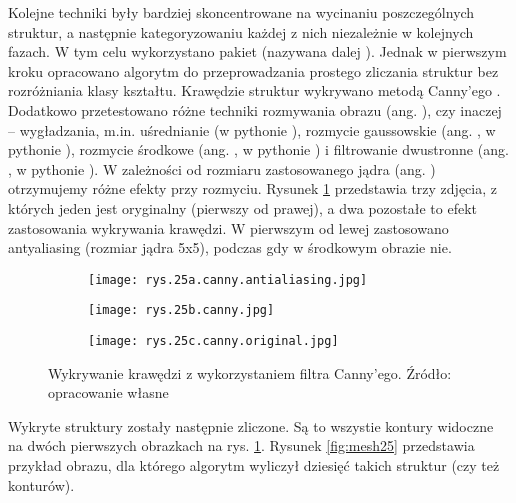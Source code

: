 Kolejne techniki były bardziej skoncentrowane na wycinaniu poszczególnych struktur, a następnie kategoryzowaniu każdej z nich niezależnie w kolejnych fazach. W tym celu wykorzystano pakiet  (nazywana dalej ). Jednak w pierwszym kroku opracowano algorytm do przeprowadzania prostego zliczania struktur bez rozróżniania klasy kształtu. Krawędzie struktur wykrywano metodą Canny'ego \cite{Canny86}. Dodatkowo przetestowano różne techniki rozmywania obrazu (ang. ), czy inaczej – wygładzania, m.in. uśrednianie (w pythonie ), rozmycie gaussowskie (ang. , w pythonie ), rozmycie środkowe (ang. , w pythonie ) i filtrowanie dwustronne (ang. , w pythonie ). 
W zależności od rozmiaru zastosowanego jądra (ang. ) otrzymujemy różne efekty przy rozmyciu. Rysunek \ref{fig:mesh24} przedstawia trzy zdjęcia, z których jeden jest oryginalny (pierwszy od prawej), a dwa pozostałe to efekt zastosowania wykrywania krawędzi. W pierwszym od lewej zastosowano antyaliasing (rozmiar jądra 5x5), podczas gdy w środkowym obrazie nie.
\begin{figure}[h]
	\centering
	\begin{subfigure}{0.29\textwidth}
	    \centering
	    \texttt{[image: rys.25a.canny.antialiasing.jpg]} %
	\end{subfigure}
	\begin{subfigure}{0.29\textwidth}
	    \centering
	    \texttt{[image: rys.25b.canny.jpg]}
	\end{subfigure}
	\begin{subfigure}{0.29\textwidth}
	    \centering
	    \texttt{[image: rys.25c.canny.original.jpg]}
	\end{subfigure}
	\caption{\label{fig:mesh24}Wykrywanie krawędzi z wykorzystaniem filtra Canny'ego. Źródło: opracowanie własne}
\end{figure}
Wykryte struktury zostały następnie zliczone. Są to wszystie kontury widoczne na dwóch pierwszych obrazkach na rys. \ref{fig:mesh24}. Rysunek \ref{fig:mesh25} przedstawia przykład obrazu, dla którego algorytm wyliczył dziesięć takich struktur (czy też konturów).
